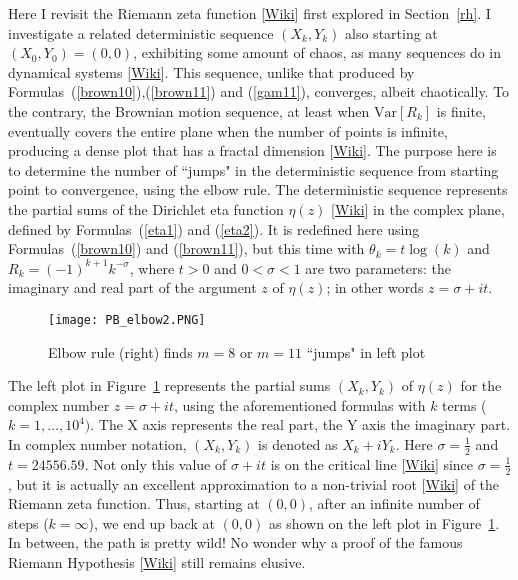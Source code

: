 \documentclass[10pt]{article}
\begin{document}
\noindent Here I revisit the \textcolor{index}{Riemann zeta function} [\href{https://en.wikipedia.org/wiki/Riemann_zeta_function}{Wiki}] first explored in Section~\ref{rh}. I investigate a related deterministic sequence $(X_k,Y_k)$ also starting at $(X_0,Y_0)=(0,0)$, exhibiting some amount of chaos, as many sequences do in \textcolor{index}{dynamical systems} [\href{https://en.wikipedia.org/wiki/Dynamical_system}{Wiki}]. This sequence, unlike that produced by Formulas~(\ref{brown10}),(\ref{brown11}) and (\ref{gam11}), converges, albeit chaotically. To the contrary, the Brownian motion sequence, at least when $\mbox{Var}[R_k]$ is finite, eventually covers the entire
plane when the number of points is infinite, producing a dense plot that has a \textcolor{index}{fractal dimension} [\href{https://en.wikipedia.org/wiki/Fractal_dimension}{Wiki}]. The purpose here is to determine the number of ``jumps"
in the deterministic sequence from starting point to convergence, using the elbow rule. The deterministic sequence represents the partial sums of the 
\textcolor{index}{Dirichlet eta function} $\eta(z)$ [\href{https://en.wikipedia.org/wiki/Dirichlet_eta_function}{Wiki}] 
 in the complex plane, defined by Formulas~(\ref{eta1}) and (\ref{eta2}). It is redefined here using Formulas~(\ref{brown10}) and (\ref{brown11}), but this time with 
$\theta_k = t \log(k)$ and $R_k=(-1)^{k+1}k^{-\sigma}$, where $t>0$ and $0<\sigma<1$ are two parameters: the imaginary and real part of the argument $z$ of $\eta(z)$; in other words $z=\sigma+it$.

\begin{figure}[H]
\centering
\texttt{[image: PB\_elbow2.PNG]} 
\caption{Elbow rule (right) finds $m = 8$ or $m=11$ ``jumps" in left plot}
\label{fig:pbelbow2}
\end{figure}

The left plot in Figure~\ref{fig:pbelbow2} represents the partial sums $(X_k, Y_k)$ of $\eta(z)$ for the complex number $z=\sigma + it$, using the aforementioned formulas with $k$ terms ($k=1,\dots,10^4)$. The X axis represents the real part, the Y axis the imaginary part. In complex number notation, $(X_k,Y_k)$ is denoted as
$X_k + i Y_k$. Here $\sigma=\frac{1}{2}$ and $t=\num{24556.59}$. Not only this value of $\sigma + it$ is on the critical line 
[\href{https://mathworld.wolfram.com/CriticalLine.html}{Wiki}]  since $\sigma=\frac{1}{2}$, but it is actually an excellent approximation to a non-trivial root 
[\href{https://mathworld.wolfram.com/RiemannZetaFunctionZeros.html}{Wiki}] of the Riemann zeta function. Thus, starting at $(0,0)$,
after an infinite number of steps ($k=\infty$), we end up back at $(0,0)$ as shown on the left plot in Figure~\ref{fig:pbelbow2}. In between, the path is pretty wild!
No wonder why a proof of the famous Riemann Hypothesis [\href{https://en.wikipedia.org/wiki/Riemann_hypothesis}{Wiki}] still remains elusive.
\end{document}
